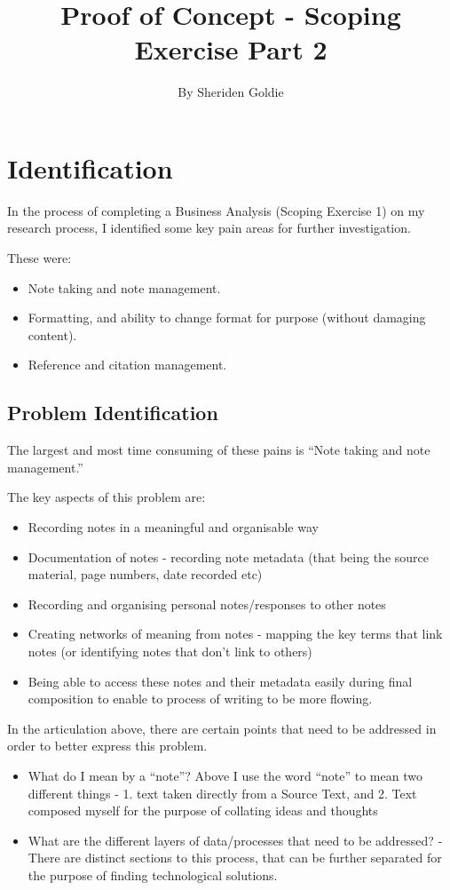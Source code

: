 \documentclass{article}
\title{Proof of Concept - Scoping Exercise Part 2}
\author{By Sheriden Goldie}
\date{}
\begin{document}
\maketitle

\tableofcontents

\pagebreak

\section{Identification}
In the process of completing a Business Analysis (Scoping Exercise 1) on my research process, I identified some key pain areas for further investigation.

These were:
\begin{itemize}
    \item Note taking and note management.
    \item Formatting, and ability to change format for purpose (without damaging content).
    \item Reference and citation management.
\end{itemize}

\subsection{Problem Identification}
The largest and most time consuming of these pains is ``Note taking and note management.''

The key aspects of this problem are:
\begin{itemize}
    \item Recording notes in a meaningful and organisable way
    \item Documentation of notes - recording note metadata (that being the source material, page numbers, date recorded etc)
    \item Recording and organising personal notes/responses to other notes
    \item Creating networks of meaning from notes - mapping the key terms that link notes (or identifying notes that don't link to others)
    \item Being able to access these notes and their metadata easily during final composition to enable to process of writing to be more flowing.
\end{itemize}

In the articulation above, there are certain points that need to be addressed in order to better express this problem. 
\begin{itemize}
    \item What do I mean by a ``note''? Above I use the word ``note'' to mean two different things - 1. text taken directly from a Source Text, and 2. Text composed myself for the purpose of collating ideas and thoughts
    \item What are the different layers of data/processes that need to be addressed? - There are distinct sections to this process, that can be further separated for the purpose of finding technological solutions.
\end{itemize}
\end{document}
